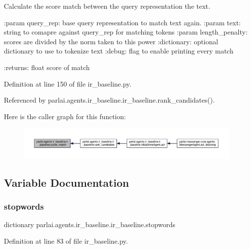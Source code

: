 \begin{DoxyVerb}Calculate the score match between the query representation the text.

:param query_rep: base query representation to match text again.
:param text: string to comapre against query_rep for matching tokens
:param length_penalty: scores are divided by the norm taken to this power
:dictionary: optional dictionary to use to tokenize text
:debug: flag to enable printing every match

:returns: float score of match
\end{DoxyVerb}
 

Definition at line 150 of file ir\+\_\+baseline.\+py.



Referenced by parlai.\+agents.\+ir\+\_\+baseline.\+ir\+\_\+baseline.\+rank\+\_\+candidates().

Here is the caller graph for this function\+:
\nopagebreak
\begin{figure}[H]
\begin{center}
\leavevmode
\includegraphics[width=350pt]{namespaceparlai_1_1agents_1_1ir__baseline_1_1ir__baseline_a64aaaccb38f5dd5f51c09439456b2f6e_icgraph}
\end{center}
\end{figure}


\subsection{Variable Documentation}
\mbox{\label{namespaceparlai_1_1agents_1_1ir__baseline_1_1ir__baseline_ad39f034177c71e873eeedb1cc2d24e52}} 
\subsubsection{\texorpdfstring{stopwords}{stopwords}}
{\footnotesize\ttfamily dictionary parlai.\+agents.\+ir\+\_\+baseline.\+ir\+\_\+baseline.\+stopwords}



Definition at line 83 of file ir\+\_\+baseline.\+py.

